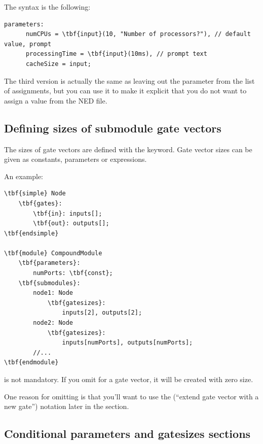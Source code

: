 The syntax is the following:

\begin{Verbatim}[commandchars=\\\{\}]
   parameters:
      numCPUs = \tbf{input}(10, "Number of processors?"), // default value, prompt
      processingTime = \tbf{input}(10ms), // prompt text
      cacheSize = input;
\end{Verbatim}

The third version is actually the same as leaving out the parameter
from the list of assignments, but you can use it to make it explicit
that you do not want to assign a value from the NED file.


\subsection{Defining sizes of submodule gate vectors}


The sizes of gate vectors are defined with the
 keyword.  Gate vector sizes
can be given as constants, parameters or expressions.

An example:

\begin{Verbatim}[commandchars=\\\{\}]
\tbf{simple} Node
    \tbf{gates}:
        \tbf{in}: inputs[];
        \tbf{out}: outputs[];
\tbf{endsimple}

\tbf{module} CompoundModule
    \tbf{parameters}:
        numPorts: \tbf{const};
    \tbf{submodules}:
        node1: Node
            \tbf{gatesizes}:
                inputs[2], outputs[2];
        node2: Node
            \tbf{gatesizes}:
                inputs[numPorts], outputs[numPorts];
        //...
\tbf{endmodule}
\end{Verbatim}


 is not mandatory.
If you omit  for a gate vector, it will be created with zero size.

One reason for omitting  is that you'll want to use
the  (``extend gate vector with a new gate'') notation later in the
 section.



\subsection{Conditional parameters and gatesizes sections}


